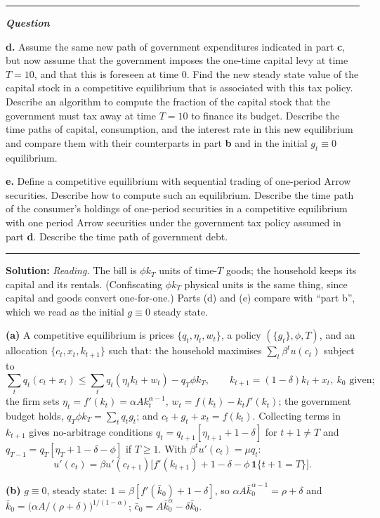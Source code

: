 \documentclass[12pt, letterpaper]{article}
\newenvironment{longquestion}{\par\small\noindent\textcolor{gray!60}{\rule{\linewidth}{0.4pt}}\par\nobreak
  \noindent\textcolor{gray!60!black}{\bfseries\textit{Question}}\par\nobreak}{\par\noindent
  \textcolor{gray!60}{\rule{\linewidth}{0.4pt}}\par}
\newcommand{\kb}{\bar k}
\newcommand{\cb}{\bar c}
\begin{document}
\begin{tcolorbox}[evenbox,title={Exercise 11.4 \quad A capital levy}]
\begin{longquestion}
\textbf{d.} Assume the same new path of government expenditures indicated in part \textbf{c}, but now assume that the
government imposes the one-time capital levy at time $T=10$, and that this is foreseen at time 0. Find the new steady
state value of the capital stock in a competitive equilibrium that is associated with this tax policy. Describe an
algorithm to compute the fraction of the capital stock that the government must tax away at time $T=10$ to finance its
budget. Describe the time paths of capital, consumption, and the interest rate in this new equilibrium and compare them
with their counterparts in part \textbf{b} and in the initial $g_t\equiv0$ equilibrium.

\textbf{e.} Define a competitive equilibrium with sequential trading of one-period Arrow securities. Describe how to
compute such an equilibrium. Describe the time path of the consumer's holdings of one-period securities in a competitive
equilibrium with one period Arrow securities under the government tax policy assumed in part \textbf{d}. Describe the
time path of government debt.
\end{longquestion}

\textbf{Solution:} \emph{Reading.} The bill is $\phi k_T$ units of time-$T$ goods; the household keeps its capital and
its rentals. (Confiscating $\phi k_T$ physical units is the same thing, since capital and goods convert one-for-one.)
Parts (d) and (e) compare with ``part b'', which we read as the initial $g\equiv0$ steady state.

\textbf{(a)} A competitive equilibrium is prices $\{q_t,\eta_t,w_t\}$, a policy $(\{g_t\},\phi,T)$, and an allocation
$\{c_t,x_t,k_{t+1}\}$ such that: the household maximises $\sum_t\beta^tu(c_t)$ subject to
\[
\sum_tq_t(c_t+x_t)\le\sum_tq_t(\eta_tk_t+w_t)-q_T\phi k_T,\qquad k_{t+1}=(1-\delta)k_t+x_t,\ k_0\text{ given};
\]
the firm sets $\eta_t=f'(k_t)=\alpha Ak_t^{\alpha-1}$, $w_t=f(k_t)-k_tf'(k_t)$; the government budget holds,
$q_T\phi k_T=\sum_tq_tg_t$; and $c_t+g_t+x_t=f(k_t)$. Collecting terms in $k_{t+1}$ gives no-arbitrage conditions
$q_t=q_{t+1}[\eta_{t+1}+1-\delta]$ for $t+1\neq T$ and $q_{T-1}=q_T[\eta_T+1-\delta-\phi]$ if $T\ge1$. With
$\beta^tu'(c_t)=\mu q_t$:
\[
u'(c_t)=\beta u'(c_{t+1})\big[f'(k_{t+1})+1-\delta-\phi\,\mathbf 1\{t+1=T\}\big].\tag{11.4.1}
\]

\textbf{(b)} $g\equiv0$, steady state: $1=\beta[f'(\kb_0)+1-\delta]$, so
$\alpha A\kb_0^{\alpha-1}=\rho+\delta$ and $\kb_0=\big(\alpha A/(\rho+\delta)\big)^{1/(1-\alpha)}$;
$\cb_0=A\kb_0^\alpha-\delta\kb_0$.


\end{tcolorbox}
\end{document}
